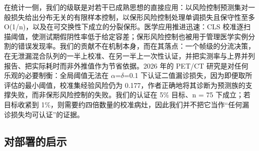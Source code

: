 \documentclass[conference]{IEEEtran}
\begin{document}
\begin{table}[t]
\centering

\caption{表5 频域与边界感知文献中报告的息肉分割精度，并标注其评测设置。各行之值不可直接比较（划分、分辨率与预算均不同），列出它们是为了让这种不可比性显式化，而非用于排名。}
\label{tab:literature}
\end{table}

在统计一侧，我们的级联是对若干已成熟思想的直接应用：以风险控制预测集对一般损失给出分布无关的有限样本控制\cite{bates2021rcps}，以保形风险控制处理单调损失且保守性至多 O(1/n)\cite{angelopoulos2022crc}，以及在可交换性下成立的分裂保形\cite{angelopoulos2021gentle}。医学应用推进迅速：CLS 校准逐扫描阈值，使测试期假阴性率低于给定容差\cite{tan2025cls}；保形风险控制也被用于管理医学实例分割的错误发现率\cite{dai2025crcfdr}。我们的贡献不在机制本身，而在其落点：一个帧级的分流决策，在无泄漏混合队列的一半上校准、在另一半上一次性认证，并把实测率与上界并列报告、把实际耗时而非外推值作为节省依据。2026 年的 PET/CT 研究是对任何乐观的必要制衡：全局阈值无法在 $\alpha$=$\delta$=0.1 下认证二值漏诊损失，因为即便取所评估的最小阈值，校准集经验风险仍为 0.177，作者正确地将其诊断为预测族的支撑失败，而非保形风险控制的失败\cite{zheng2026crc}。我们的认证在 5\% 目标、n = 75 下成立；若目标收紧到 1\%，则需要约四倍数量的校准病灶，因此我们并不把它当作“任何漏诊损失均可认证”的证据。

\subsection{对部署的启示}
\end{document}
